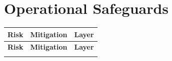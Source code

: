 \documentclass[11pt,a4paper]{article}
\begin{document}
\section{Operational Safeguards}

\begin{longtable}{L{4cm} L{9cm} C{1.8cm}}
    \toprule
    \color{white}\textbf{Risk} & \color{white}\textbf{Mitigation} & \color{white}\textbf{Layer} \\
    \midrule
    \endfirsthead
    \toprule
    \color{white}\textbf{Risk} & \color{white}\textbf{Mitigation} & \color{white}\textbf{Layer} \\
    \midrule
    \endhead
    \bottomrule
    \endfoot


\end{longtable}
\end{document}
